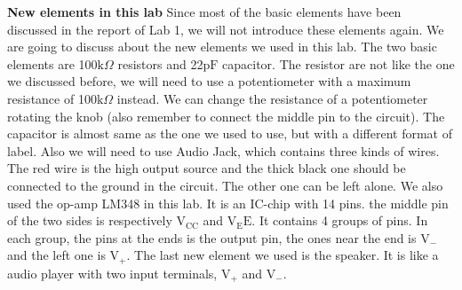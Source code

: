 \vspace{-5pt} \hfill \newline
\textbf{New elements in this lab} \newline
\phantom{ } Since most of the basic elements have been discussed in the report of Lab 1, we will not introduce these elements again. We are going to discuss about the new elements we used in this lab. The two basic elements are 100$ \si{\kilo\Omega} $ resistors and 22$\si{\pico\farad}$ capacitor. The resistor are not like the one we discussed before, we will need to use a potentiometer with a maximum resistance of 100$ \si{\kilo\Omega} $ instead. We can change the resistance of a potentiometer rotating the knob (also remember to connect the middle pin to the circuit). The capacitor is almost same as the one we used to use, but with a different format of label. Also we will need to use Audio Jack, which contains three kinds of wires. The red wire is the high output source and the thick black one should be connected to the ground in the circuit. The other one can be left alone. We also used the op-amp LM348 in this lab. It is an IC-chip with 14 pins. the middle pin of the two sides is respectively $ \mathrm{V_{CC}} $ and $ \mathrm{V_EE} $. It contains 4 groups of pins. In each group, the pins at the ends is the output pin, the ones near the end is $ \mathrm{V_-} $ and the left one is $ \mathrm{V_+} $. The last new element we used is the speaker. It is like a audio player with two input terminals, $ \mathrm{V_+} $ and  $ \mathrm{V_-} $.
